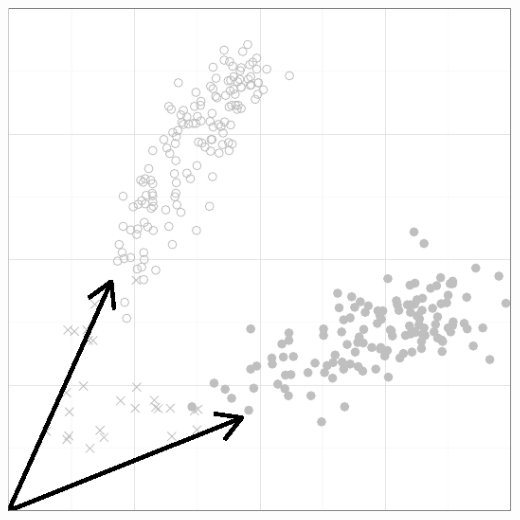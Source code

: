 \documentclass{article}\usepackage[]{graphicx}\usepackage[]{color}
\makeatletter
\def\maxwidth{ %
  \ifdim\Gin@nat@width>\linewidth
    \linewidth
  \else
    \Gin@nat@width
  \fi
}
\newenvironment{knitrout}{}{} %
\makeatother
\begin{document}
\begin{knitrout}
{}




{\centering \includegraphics[width=\maxwidth]{figure/smallplots-3} 

}



\end{knitrout}
\end{document}
